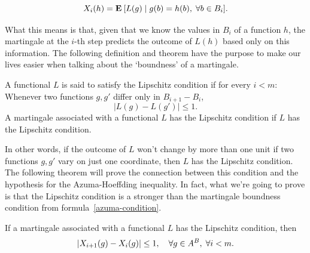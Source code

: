 \[ X_i(h) = \mathbf{E}\:[ L(g) \;|\; g(b) = h(b),\; \forall b\in B_i ]. \] 

What this means is that, given that we know the values in $B_i$ of a function $h$, the martingale at the $i$-th step predicts the outcome of $L(h)$ based only on this information. The following definition and theorem have the purpose to make our lives easier when talking about the `boundness' of a martingale.

\begin{definition}
    A functional $L$ is said to satisfy the Lipschitz condition if for every $i < m$: Whenever two functions $g, g'$ differ only in $B_{i+1}- B_i$,
    \[ |L(g) - L(g')| \leq 1. \]
    A martingale associated with a functional $L$ has the Lipschitz condition if $L$ has the Lipschitz condition.
\end{definition}

In other words, if the outcome of $L$ won't change by more than one unit if two functions $g, g'$ vary on just one coordinate, then $L$ has the Lipschitz condition. The following theorem will prove the connection between this condition and the hypothesis for the Azuma-Hoeffding inequality. In fact, what we're going to prove is that the Lipschitz condition is a stronger than the martingale boundness condition from formula~\ref{azuma-condition}.

\begin{theorem}\label{lipschitz-condition}
    If a martingale associated with a functional $L$ has the Lipschitz condition, then
    \[ |X_{i+1}(g)- X_i(g)| \leq 1,\hspace*{1em} \forall g\in A^B,\; \forall i < m. \] 
\end{theorem}

